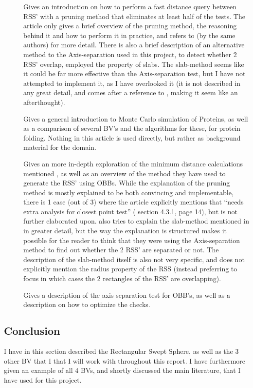 \begin{description}
\item[\cite{larsen00fast}] Gives an introduction on how to perform a fast distance query between RSS' with a pruning method that eliminates at least half of the tests. The article only gives a brief overview of the pruning method, the reasoning behind it and how to perform it in practice, and refers to \cite{Larsen99fastproximity} (by the same authors) for more detail. There is also a brief description of an alternative method to the Axis-separation used in this project, to detect whether 2 RSS' overlap, employed the property of slabs. The slab-method seems like it could be far more effective than the Axis-separation test, but I have not attempted to implement it, as I have overlooked it (it is not described in any great detail, and comes after a reference to \cite{Larsen99fastproximity}, making it seem like an afterthought).   

\item[\cite{Lotan03algorithmand}] Gives a general introduction to Monte Carlo simulation of Proteins, as well as a comparison of several BV's and the algorithms for these, for protein folding. Nothing in this article is used directly, but rather as background material for the domain.

\item[\cite{Larsen99fastproximity}] Gives an more in-depth exploration of the minimum distance calculations mentioned \cite{larsen00fast}, as well as an overview of the method they have used to generate the RSS' using OBBs. While the explanation of the pruning method is mostly explained to be both convincing and implementable, there is 1 case (out of 3) where the article explicitly mentions that ``needs extra analysis for closest point test'' (\cite{Larsen99fastproximity} section 4.3.1, page 14), but is not further elaborated upon. \cite{Larsen99fastproximity} also tries to explain the slab-method mentioned in \cite{larsen00fast} in greater detail, but the way the explanation is structured makes it possible for the reader to think that they were using the Axis-separation method to find out whether the 2 RSS' are separated or not. The description of the slab-method itself is also not very specific, and does not explicitly mention the radius property of the RSS (instead preferring to focus in which cases the 2 rectangles of the RSS' are overlapping).

\item[\cite{237244}] Gives a description of the axis-separation test for OBB's, as well as a description on how to optimize the checks.
\end{description}

\subsection{Conclusion}
I have in this section described the Rectangular Swept Sphere, as well as the 3 other BV that I that I will work with throughout this report. I have furthermore given an example of all 4 BVs, and shortly discussed the main literature, that I have used for this project.
